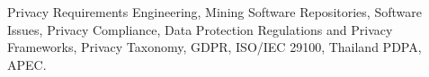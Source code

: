 \documentclass[final,5p,times,twocolumn]{elsarticle}
\begin{document}
\begin{abstract}

\end{abstract}

\begin{keyword}
Privacy Requirements Engineering, Mining Software Repositories, Software Issues, Privacy Compliance, Data Protection Regulations and Privacy Frameworks, Privacy Taxonomy, GDPR, ISO/IEC 29100, Thailand PDPA, APEC.
\end{keyword}

\maketitle















 



\balance



\end{document}
